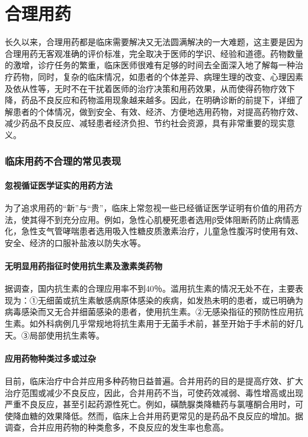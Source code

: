 \chapter{合理用药}

长久以来，合理用药都是临床需要解决又无法圆满解决的一大难题，这主要是因为合理用药无客观准确的评价标准，完全取决于医师的学识、经验和道德。药物数量的激增，诊疗任务的繁重，临床医师很难有足够的时间去全面深入地了解每一种治疗药物，同时，复杂的临床情况，如患者的个体差异、病理生理的改变、心理因素及依从性等，无时不在干扰着医师的治疗决策和用药效果，从而使得药物疗效下降，药品不良反应和药物滥用现象越来越多。因此，在明确诊断的前提下，详细了解患者的个体情况，做到安全、有效、经济、方便地选用药物，对提高药物疗效、减少药品不良反应、减轻患者经济负担、节约社会资源，具有非常重要的现实意义。

\subsection{临床用药不合理的常见表现}

\subsubsection{忽视循证医学证实的用药方法}

为了追求用药的“新”与“贵”，临床上常忽视一些已经循证医学证明有价值的用药方法，使其得不到充分应用。例如，急性心肌梗死患者选用β受体阻断药防止病情恶化，急性支气管哮喘患者选用吸入性糖皮质激素治疗，儿童急性腹泻时使用有效、安全、经济的口服补盐液以防失水等。

\subsubsection{无明显用药指征时使用抗生素及激素类药物}

据调查，国内抗生素的合理应用率不到40％。滥用抗生素的情况无处不在，主要表现为：①无细菌或抗生素敏感病原体感染的疾病，如发热未明的患者，或已明确为病毒感染而又无合并细菌感染的患者，使用抗生素。②无感染指征的预防性应用抗生素。如外科病例几乎常规地将抗生素用于无菌手术前，甚至开始于手术前的好几天。③局部使用抗生素等。

\subsubsection{应用药物种类过多或过杂}

目前，临床治疗中合并应用多种药物日益普遍。合并用药的目的是提高疗效、扩大治疗范围或减少不良反应，因此，合并用药不当，可使药效减弱、毒性增高或出现严重不良反应，甚至引起药源性死亡。例如，磺酰脲类降糖药与氯噻酮合用时，可使降血糖的效果降低。然而，临床上合并用药更常见的是药品不良反应的增加。据调查，合并应用药物的种类愈多，不良反应的发生率也愈高。

